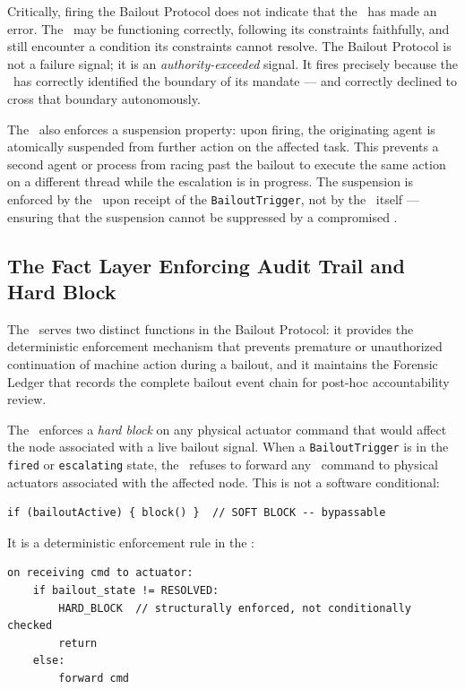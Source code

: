Critically, firing the Bailout Protocol does not indicate that the \bounds\ has made an error. The \bounds\ may be functioning correctly, following its constraints faithfully, and still encounter a condition its constraints cannot resolve. The Bailout Protocol is not a failure signal; it is an \textit{authority-exceeded} signal. It fires precisely because the \bounds\ has correctly identified the boundary of its mandate --- and correctly declined to cross that boundary autonomously.

The \bounds\ also enforces a suspension property: upon firing, the originating agent is atomically suspended from further action on the affected task. This prevents a second agent or process from racing past the bailout to execute the same action on a different thread while the escalation is in progress. The suspension is enforced by the \fact\ upon receipt of the \texttt{BailoutTrigger}, not by the \bounds\ itself --- ensuring that the suspension cannot be suppressed by a compromised \bounds.

\subsection{The Fact Layer Enforcing Audit Trail and Hard Block}
\label{sec:fact-enforcement}

The \fact\ serves two distinct functions in the Bailout Protocol: it provides the deterministic enforcement mechanism that prevents premature or unauthorized continuation of machine action during a bailout, and it maintains the Forensic Ledger that records the complete bailout event chain for post-hoc accountability review.

The \fact\ enforces a \textit{hard block} on any physical actuator command that would affect the node associated with a live bailout signal. When a \texttt{BailoutTrigger} is in the \texttt{fired} or \texttt{escalating} state, the \fact\ refuses to forward any \bounds\ command to physical actuators associated with the affected node. This is not a software conditional:

\begin{verbatim}
if (bailoutActive) { block() }  // SOFT BLOCK -- bypassable
\end{verbatim}

It is a deterministic enforcement rule in the \fact:

\begin{verbatim}
on receiving cmd to actuator:
    if bailout_state != RESOLVED:
        HARD_BLOCK  // structurally enforced, not conditionally checked
        return
    else:
        forward cmd
\end{verbatim}

